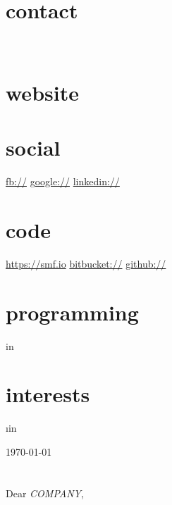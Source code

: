 \documentclass[]{fancy-cv}
\newcommand\company{\emph{COMPANY}}
\begin{document}
\header{\MakeLowercase\myfirstname}{\MakeLowercase\mylastname}{\MakeLowercase\mytitle}

\begin{aside}
  \section{contact}
    \href{mailto:\myemail}{\myemail}
    ~
    \myphone
    ~
    \myaddress%
    \mycity
  \section{website}
    \href{\mywebsite}{\mywebsite}
  \section{social}
    \href{http://facebook.com/\myfb}{fb://\myfb}
    \href{http://plug.google.com/\mygp}{google://\mygp}
    \href{http://www.linkedin.com/in/\mylinkedin}{linkedin://\mylinkedin}
  \section{code}
    \href{https://smf.io}{https://smf.io}
    \href{https://bitbucket.org/\myfb}{bitbucket://\myfb}
    \href{https://github.com/\myfb}{github://\myfb}
  \section{programming}
     \lang in \programming {%
      \lang
    }%
  \section{interests}
     \i in \interests {%
      \MakeLowercase\i
    }%
\end{aside}

\vspace{.8em}
\large
\today\\
\\
\\
Dear \company,
\end{document}
